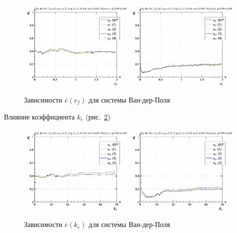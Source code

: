 \begin{figure}[ht!]
\begin{center}
  \includegraphics[width=0.49\textwidth]{p/cha/vdp/vdp_id-p_v_f_sign.png}
  \hfill
  \includegraphics[width=0.49\textwidth]{p/cha/vdp/vdp_id-p_v_f_sin.png}
\end{center}
  \caption{Зависимости $\bar{e}(v_f)$ для системы Ван-дер-Поля}
\label{atu:f:vdp_e_v_f}
\end{figure}

Влияние коэффициента $k_e$ (рис.~\ref{atu:f:vdp_e_k_e})

\begin{figure}[ht!]
\begin{center}
  \includegraphics[width=0.49\textwidth]{p/cha/vdp/vdp_id-p_k_e_sign.png}
  \hfill
  \includegraphics[width=0.49\textwidth]{p/cha/vdp/vdp_id-p_k_e_sin.png}
\end{center}
  \caption{Зависимости $\bar{e}(k_e)$ для системы Ван-дер-Поля}
\label{atu:f:vdp_e_k_e}
\end{figure}

